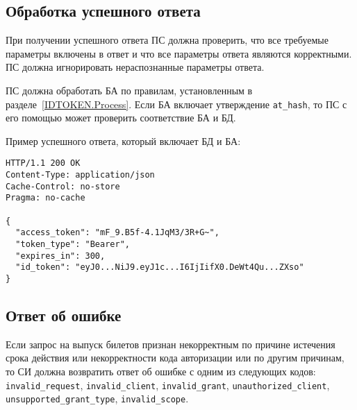 \subsection{Обработка успешного ответа}\label{REQRESP.Token.Resp}

При получении успешного ответа ПС должна проверить, что все
требуемые параметры включены в ответ и что все параметры ответа являются
корректными. ПС должна игнорировать нераспознанные параметры ответа.

ПС должна обработать БА по правилам, установленным в разделе~\ref{IDTOKEN.Process}.
%
Если БА включает утверждение \lstinline{at_hash}, то ПС с его помощью 
может проверить соответствие БА и БД.

Пример успешного ответа, который включает БД и БА:
%
\begin{lstlisting}
HTTP/1.1 200 OK
Content-Type: application/json
Cache-Control: no-store
Pragma: no-cache

{
  "access_token": "mF_9.B5f-4.1JqM3/3R+G~",
  "token_type": "Bearer",
  "expires_in": 300,
  "id_token": "eyJ0...NiJ9.eyJ1c...I6IjIifX0.DeWt4Qu...ZXso"
}
\end{lstlisting}

\subsection{Ответ об ошибке}\label{REQRESP.Token.Error}

Если запрос на выпуск билетов признан некорректным по причине 
истечения срока действия или некорректности кода авторизации
или по другим причинам, то СИ должна возвратить ответ об ошибке с одним из 
следующих кодов:
\lstinline{invalid_request}, %
\lstinline{invalid_client}, %
\lstinline{invalid_grant}, %
\lstinline{unauthorized_client}, %
\lstinline{unsupported_grant_type}, %
\lstinline{invalid_scope}. %
